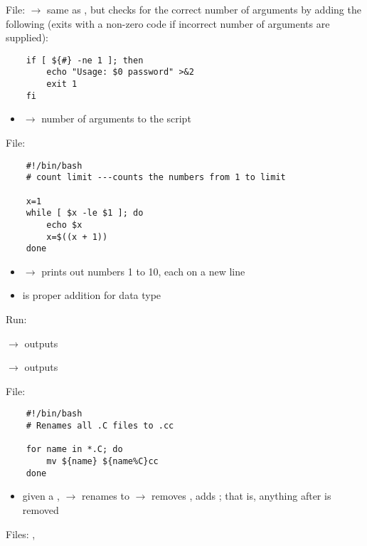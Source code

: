 File:  $ \rightarrow $ same as ,
but checks for the correct number of arguments by adding the following
(exits with a non-zero code if incorrect number of arguments are supplied):

\begin{lstlisting}
    if [ ${#} -ne 1 ]; then
        echo "Usage: $0 password" >&2
        exit 1
    fi
\end{lstlisting}

\begin{itemize}
    \item \code{\$\{\#\}} $ \rightarrow $ number of arguments to the script
\end{itemize}

File: 
\begin{lstlisting}
    #!/bin/bash
    # count limit ---counts the numbers from 1 to limit

    x=1
    while [ $x -le $1 ]; do
        echo $x
        x=$((x + 1))
    done
\end{lstlisting}
\begin{itemize}
    \item {} $ \rightarrow $ prints out numbers 1 to 10,
    each on a new line
    \item {} is proper addition for  data type
\end{itemize}

Run:  

 $ \rightarrow $ outputs 

 $ \rightarrow $ outputs 

File: 

\begin{lstlisting}
    #!/bin/bash
    # Renames all .C files to .cc
    
    for name in *.C; do
        mv ${name} ${name%C}cc
    done
\end{lstlisting}
\begin{itemize}
    \item given a ,  
    $ \rightarrow $ renames 
    to  $ \rightarrow $ removes , adds ; that is,
    anything after \code{\%} is removed
\end{itemize}

Files: , 

